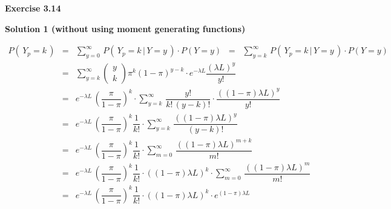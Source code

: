 
\noindent
\textbf{Exercise 3.14}

\vskip 0.3cm
\noindent
\textbf{Solution 1 (without using moment generating functions)}

\begin{eqnarray*}
          P(\,Y_{p} = k\,)
&=&       \sum_{y=0}^{\infty}\,P(\,Y_{p} = k\,\vert\,Y=y\,)\cdot P(Y = y)
\;\;=\;\; \sum_{y=k}^{\infty}\,P(\,Y_{p} = k\,\vert\,Y=y\,)\cdot P(Y = y)
\\
&=&       \sum_{y=k}^{\infty}
          \left(\!\begin{array}{c} y \\ k \end{array}\!\right)
          \pi^{k} (1 - \pi)^{y-k} \cdot e^{-\lambda L} \dfrac{(\lambda L)^{y}}{y!}
\\
&=&
          e^{-\lambda L}\,\left(\dfrac{\pi}{1-\pi}\right)^{k}\cdot
          \sum_{y=k}^{\infty}\,
          \dfrac{y!}{k!\,(y-k)!}\cdot\dfrac{((1-\pi)\lambda L)^{y}}{y!}
\\
&=&
          e^{-\lambda L}\,\left(\dfrac{\pi}{1-\pi}\right)^{k}\dfrac{1}{k!}
          \cdot
          \sum_{y=k}^{\infty}\,\dfrac{((1-\pi)\lambda L)^{y}}{(y-k)!}
\\
&=&
          e^{-\lambda L}\,\left(\dfrac{\pi}{1-\pi}\right)^{k}\dfrac{1}{k!}
          \cdot
          \sum_{m=0}^{\infty}\,\dfrac{((1-\pi)\lambda L)^{m+k}}{m!}
\\
&=&
          e^{-\lambda L}\,\left(\dfrac{\pi}{1-\pi}\right)^{k}\dfrac{1}{k!}
          \cdot
          ((1-\pi)\lambda L)^{k}
          \cdot
          \sum_{m=0}^{\infty}\,\dfrac{((1-\pi)\lambda L)^{m}}{m!}
\\
&=&
          e^{-\lambda L}\,\left(\dfrac{\pi}{1-\pi}\right)^{k}\dfrac{1}{k!}
          \cdot
          ((1-\pi)\lambda L)^{k}
          \cdot e^{(1-\pi)\lambda L}
\end{eqnarray*}


